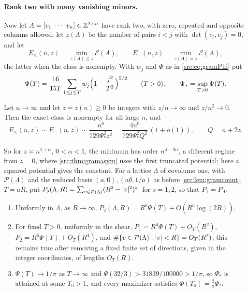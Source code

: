 \paragraph{Rank two with many vanishing minors.} Now let $A=[v_1\ \cdots\ v_n]\in\mathbb{Z}^{2\times n}$ have rank two,
with zero, repeated and opposite columns allowed, let $z(A)$ be the number of pairs $i<j$ with
$\det(v_i,v_j)=0$, and let
\[
 E_\le(n,z)=\min_{z(A)\le z}\mathcal E(A),\qquad E_=(n,z)=\min_{z(A)=z}\mathcal E(A),
\]
the latter when the class is nonempty. With $w_j$ and $\Phi$ as in \eqref{src:eq:gramPhi} put
\begin{equation}\label{spn:eq:gramPsi}
 \Psi(T)=\frac{16}{15T}\sum_{1\le j\le T}w_j\Bigl(1-\frac{j^2}{T^2}\Bigr)^{5/2}\qquad(T>0),\qquad
 \Psi_*=\sup_{T>0}\Psi(T).
\end{equation}

\begin{theorem}\label{spn:thm:gramdegenerate}
Let $n\to\infty$ and let $z=z(n)\ge0$ be integers with $z/n\to\infty$ and $z/n^2\to0$. Then the exact class is
nonempty for all large $n$, and
\[
 E_\le(n,z)\sim E_=(n,z)\sim\frac{n^6}{729\Psi_*^2z^2}=\frac{4n^6}{729\Psi_*^2Q^2}\,(1+o(1)),\qquad Q=n+2z .
\]
\end{theorem}

So for $z\asymp n^{1+\alpha}$, $0<\alpha<1$, the minimum has order $n^{4-2\alpha}$, a different regime from
$z=0$, where \cref{src:thm:gramasym} uses the first truncated potential; here a squared potential gives the
constant. For a lattice $\Lambda$ of covolume one, with $\mathcal P(\Lambda)$ and the reduced basis
$(a,0),(a\theta,1/a)$ as before \cref{src:lem:gramcount}, $T=aR$, put
$P_s(\Lambda,R)=\sum_{v\in\mathcal P(\Lambda)}(R^2-\lvert v\rvert^2)_+^s$ for $s=1,2$, so that $P_1=P_\Lambda$.

\begin{lemma}\label{spn:lem:gramsquared}
\begin{enumerate}[label=\textup{(\roman*)}]
\item Uniformly in $\Lambda$, as $R\to\infty$, $P_2(\Lambda,R)=R^6\Psi(T)+O(R^5\log(2R))$.
\item For fixed $T>0$, uniformly in the shear, $P_1=R^4\Phi(T)+O_T(R^2)$, $P_2=R^6\Psi(T)+O_T(R^4)$, and
$\#\{v\in\mathcal P(\Lambda):\lvert v\rvert<R\}=O_T(R^2)$; this remains true after removing a fixed finite set of
directions, given in the integer coordinates, of lengths $O_T(R)$.
\item $\Psi(T)\to1/\pi$ as $T\to\infty$ and $\Psi(32/3)>31839/100000>1/\pi$, so $\Psi_*$ is attained at some
$T_0>1$, and every maximizer satisfies $\Phi(T_0)=\frac32\Psi_*$.
\end{enumerate}
\end{lemma}


